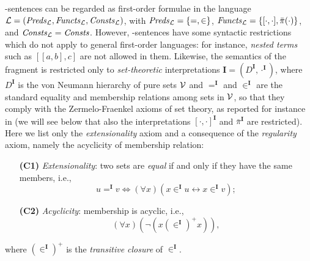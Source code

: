 \documentclass[a4paper]{llncs}
\newcommand{\Lang}{\ensuremath{\mathcal{L}\xspace}} %
\newcommand{\LangPreds}{\Preds_{\Lang}}
\newcommand{\LangFuncts}{\Functs_{\Lang}}
\newcommand{\LangConsts}{\Consts_{\Lang}}
\newcommand{\nonpairssym}{\bar{\pi}}
\newcommand{\nonpairs}[1]{\nonpairssym(#1)}
\newcommand{\inter}{\ensuremath{\mathbf{I}}\xspace}
\begin{document}
\Forallpizero-sentences can be regarded as first-order
formulae in the language $\Lang=(\LangPreds, \LangFuncts, \LangConsts)$, with
$\LangPreds=\{ = ,\in \}$, $\LangFuncts=\{ [\cdot, \cdot], 
\nonpairs{\cdot} \}$,
and $\LangConsts=\Consts$. However, \Forallpizero-sentences have some
syntactic restrictions which do not apply to general first-order
languages: for instance, \emph{nested terms} such as $[[a,b],c]$ are not
allowed in them. Likewise, the semantics of the fragment 
\Forallpizero is restricted only to \emph{set-theoretic} 
interpretations $\inter=(D^{\inter}, \cdot^\inter)$, where 
$D^{\inter}$ is the von Neumann hierarchy of pure sets $\mathcal{V}$ and 
$=^{\inter}$ and $\in^{\inter}$ are the standard equality and 
membership relations among sets in $\mathcal{V}$, so that they comply with 
the Zermelo-Fraenkel axioms of set theory, as reported for instance 
in \cite{Mos2005} (we will see below  that  also the interpretations 
$[\cdot,\cdot]^\inter$ and $\nonpairssym^{\inter}$ are restricted).
Here we list only the \emph{extensionality} axiom and a consequence 
of the \emph{regularity} axiom, namely the acyclicity of membership 
relation:
\begin{enumerate}[leftmargin=.9cm]
  \item[\textbf{(C1)}]\label{EXT} \emph{Extensionality}: two sets are 
\emph{equal} if and only if they have the same members, i.e.,
\[
  u =^{\inter} v \iff (\forall x)(x \in^{\inter} u \leftrightarrow x 
\in^{\inter} v) ;
\]
  \item[\textbf{(C2)}]\label{REG} \emph{Acyclicity}: membership is 
acyclic, i.e.,
\[
  (\forall x)(\neg (x \mathrel{(\in^{\inter})^{+}} x)) ,
\]
\end{enumerate}
where $(\in^{\inter})^{+}$ is the \emph{transitive closure} of $\in^{\inter}$.
%
\end{document}
